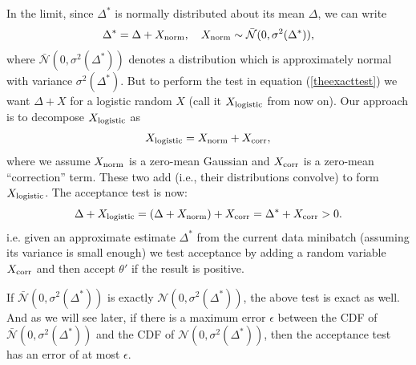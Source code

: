 \documentclass{article}
\begin{document}
In the limit, since $\Delta^*$ is normally distributed about its mean $\Delta$, we
can write
\begin{equation}\label{eq:relationship}
\Delta^* = \Delta + X_{\rm norm}, \quad X_{\rm norm} \sim \mathcal{\bar{N}}(0, \sigma^2(\Delta^*)),
\end{equation}
where $\mathcal{\bar{N}}(0, \sigma^2(\Delta^*))$ denotes a distribution which is approximately
normal with variance $\sigma^2(\Delta^*)$. 
But to perform the test in equation (\ref{theexacttest}) we want $\Delta + X$ for
a logistic random $X$ (call it $X_{\rm logistic}$ from now on). 
Our approach is to decompose $X_{\rm logistic}$ as
\begin{equation}\label{eq:deconvolution}
X_{\rm logistic} = X_{\rm norm}+X_{\rm corr},
\end{equation}
where we assume $X_{\rm norm}$ is a zero-mean Gaussian and $X_{\rm corr}$ is a zero-mean
``correction'' term.  These two add (i.e., their distributions convolve) to form $X_{\rm logistic}$. The acceptance
test is now:
\begin{equation}\label{eq:criteria}
\Delta + X_{\rm logistic} = (\Delta + X_{\rm norm}) + X_{\rm corr} = \Delta^* + X_{\rm corr} >0.
\end{equation}
i.e. given an approximate estimate $\Delta^*$ from the current data minibatch (assuming its
variance is small enough) we test acceptance by adding a random variable $X_{\rm corr}$ and
then accept $\theta'$ if the result is positive.

If $\mathcal{\bar{N}}(0, \sigma^2(\Delta^*))$ is exactly $\mathcal{N}(0, \sigma^2(\Delta^*))$,
the above test is exact as well. And as we will see later,  if there is a maximum error $\epsilon$ between
the CDF of $\mathcal{\bar{N}}(0, \sigma^2(\Delta^*))$ and the CDF of $\mathcal{N}(0, \sigma^2(\Delta^*))$,
then the acceptance test has an error of at most $\epsilon$. 
\end{document}
